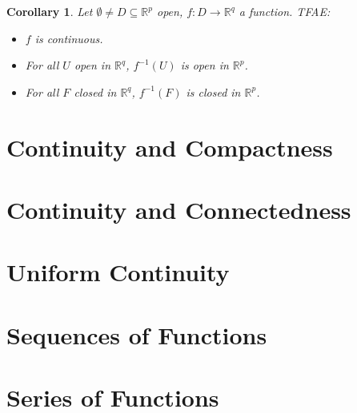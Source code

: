 \documentclass[12pt]{amsbook}
\newtheorem{corollary}[theorem]{Corollary}
\theoremstyle{definition}
\newcommand{\RR}{{\mathbb R}}
\newcommand{\ra}{\rightarrow} %
\begin{document}
\begin{corollary} 

Let $\emptyset \neq D \subseteq \RR^p$ open, $f: D \ra \RR^q$ a function. TFAE:
\begin{itemize}
\item[(i)] $f$ is continuous.
\item[(ii)] For all $U$ open in $\RR^q$, $f^{-1}(U)$ is open in $\RR^p$.
\item[(iii)] For all $F$ closed in $\RR^q$, $f^{-1}(F)$ is closed in $\RR^p$.
\end{itemize}
\end{corollary}

\section{Continuity and Compactness}

\section{Continuity and Connectedness}

\section{Uniform Continuity}

\section{Sequences of Functions}

\section{Series of Functions}
\end{document}
